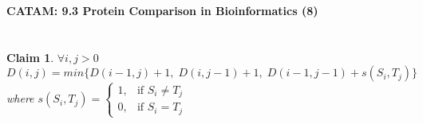 \documentclass{article}
\newtheorem{claim}[theorem]{Claim}
\begin{document}
\hfill{}

\begin{center}\LARGE\bf
CATAM: 9.3 Protein Comparison in Bioinformatics (8)
\end{center}

	\section{}
	\begin{claim}
		
	$ \forall i, j > 0 $
	\begin{equation}
		D(i, j) = min \{D(i-1, j) + 1, \; D(i, j-1) + 1, \; D(i-1, j-1) + s(S_i, T_j)\}
	\label{q1_eqn}	
	\end{equation}
	where $ s(S_i, T_j) = \begin{cases}
		1, & \text{if } S_i \neq T_j\\
		0, & \text{if } S_i = T_j 
	\end{cases}$
	\end{claim}
\end{document}
